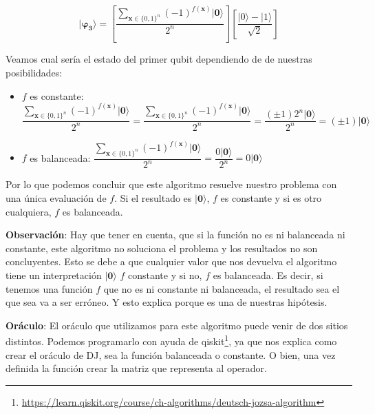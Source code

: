  \begin{equation}
     \mathbf{|\varphi_{3}\rangle}=\left[ \dfrac{\sum_{\mathbf{x} \in \{0,1\}^{n}}(-1)^{f(\mathbf{x})}|\mathbf{0}\rangle}{2^{n}}\right] \left[ \dfrac{|0\rangle - |1\rangle}{\sqrt{2}}\right]
 \end{equation}

 \vspace{10pt}

 Veamos cual sería el estado del primer qubit dependiendo de de nuestras posibilidades:\newline

 \begin{itemize}
     \item $f$ es constante:  $\dfrac{\sum_{\mathbf{x} \in \{0,1\}^{n}}(-1)^{f(\mathbf{x})}|\mathbf{0}\rangle}{2^{n}}=\dfrac{\sum_{\mathbf{x} \in \{0,1\}^{n}}(-1)^{f(\mathbf{x})}|\mathbf{0}\rangle}{2^{n}}=\dfrac{(\pm1)2^{n}|\mathbf{0}\rangle}{2^{n}}=(\pm1)|\mathbf{0}\rangle$

     \item $f$ es balanceada: 
     $\dfrac{\sum_{\mathbf{x} \in \{0,1\}^{n}}(-1)^{f(\mathbf{x})}|\mathbf{0}\rangle}{2^{n}}=\dfrac{0|\mathbf{0}\rangle}{2^{n}}=0|\mathbf{0}\rangle$
 \end{itemize}

 \vspace{5pt}

 Por lo que podemos concluir que este algoritmo resuelve nuestro problema con una única evaluación de $f$. Si el resultado es $|\mathbf{0}\rangle$, $f$ es constante y si es otro cualquiera, $f$ es balanceada. \newline

 \textbf{Observación}: Hay que tener en cuenta, que si la función no es ni balanceada ni constante, este algoritmo no soluciona el problema y los resultados no son concluyentes. Esto se debe a que cualquier valor que nos devuelva el algoritmo tiene un interpretación $|\textbf{0}\rangle$ $f$ constante y si no, $f$ es balanceada. Es decir, si tenemos una función $f$ que no es ni constante ni balanceada, el resultado sea el que sea va a ser erróneo. Y esto explica porque es una de nuestras hipótesis. \newline

\textbf{Oráculo}: El oráculo que utilizamos para este algoritmo puede venir de dos sitios distintos. Podemos programarlo con ayuda de qiskit\footnote{\url{https://learn.qiskit.org/course/ch-algorithms/deutsch-jozsa-algorithm}}, ya que nos explica como crear el oráculo de DJ, sea la función balanceada o constante. O bien, una vez definida la función crear la matriz que representa al operador.\newline
 
